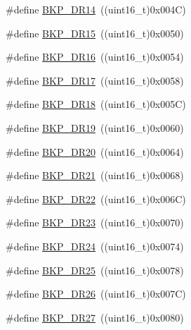 \begin{DoxyCompactItemize}
\item 
\#define \hyperlink{group___data___backup___register_ga47211005caa15e93e138691ba9bf2fa1}{B\+K\+P\+\_\+\+D\+R14}~((uint16\+\_\+t)0x004\+C)
\item 
\#define \hyperlink{group___data___backup___register_ga230f292dd8ef4e259630fd4f37d75869}{B\+K\+P\+\_\+\+D\+R15}~((uint16\+\_\+t)0x0050)
\item 
\#define \hyperlink{group___data___backup___register_ga4e12740ecfe8fcce668263c21df5492d}{B\+K\+P\+\_\+\+D\+R16}~((uint16\+\_\+t)0x0054)
\item 
\#define \hyperlink{group___data___backup___register_ga2d7c7e1c601b0313e60d876560a34329}{B\+K\+P\+\_\+\+D\+R17}~((uint16\+\_\+t)0x0058)
\item 
\#define \hyperlink{group___data___backup___register_ga43856bf6f92d07ffea0f96f5243ed8a2}{B\+K\+P\+\_\+\+D\+R18}~((uint16\+\_\+t)0x005\+C)
\item 
\#define \hyperlink{group___data___backup___register_ga67587a68a981d5d8e0b1302d21db1f9b}{B\+K\+P\+\_\+\+D\+R19}~((uint16\+\_\+t)0x0060)
\item 
\#define \hyperlink{group___data___backup___register_gaafdc2f269b669c81734360e09d94cee2}{B\+K\+P\+\_\+\+D\+R20}~((uint16\+\_\+t)0x0064)
\item 
\#define \hyperlink{group___data___backup___register_gabb044653f8eda603075107603949d84a}{B\+K\+P\+\_\+\+D\+R21}~((uint16\+\_\+t)0x0068)
\item 
\#define \hyperlink{group___data___backup___register_gab78636475b284bbaeb819d510cfcc397}{B\+K\+P\+\_\+\+D\+R22}~((uint16\+\_\+t)0x006\+C)
\item 
\#define \hyperlink{group___data___backup___register_gafe53f4315942eeb540b307a2b534dc2a}{B\+K\+P\+\_\+\+D\+R23}~((uint16\+\_\+t)0x0070)
\item 
\#define \hyperlink{group___data___backup___register_ga7fa403483a916fa56826a5f7f79551e4}{B\+K\+P\+\_\+\+D\+R24}~((uint16\+\_\+t)0x0074)
\item 
\#define \hyperlink{group___data___backup___register_ga99c4f81f642716e6b4544284d938ee9f}{B\+K\+P\+\_\+\+D\+R25}~((uint16\+\_\+t)0x0078)
\item 
\#define \hyperlink{group___data___backup___register_ga06b425e00596cf4c6a43e638f7542e0a}{B\+K\+P\+\_\+\+D\+R26}~((uint16\+\_\+t)0x007\+C)
\item 
\#define \hyperlink{group___data___backup___register_ga282338412a00b49dc1fde17f8eacbae9}{B\+K\+P\+\_\+\+D\+R27}~((uint16\+\_\+t)0x0080)
\item 

\end{DoxyCompactItemize}
